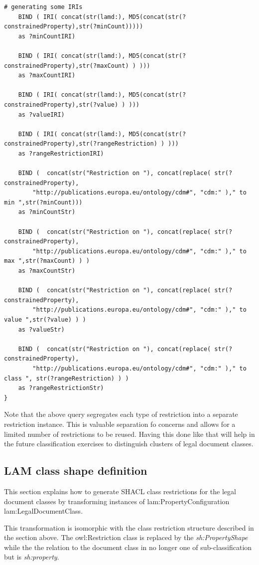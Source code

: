 \begin{lstlisting}[language=SPARQL, captionpos=b, caption={The transformation SPARQL query for LAM legal document class restrictions}, label=lst:sparql-class-restriction]
	# generating some IRIs
	BIND ( IRI( concat(str(lamd:), MD5(concat(str(?constrainedProperty),str(?minCount))))) 
	as ?minCountIRI)
	
	BIND ( IRI( concat(str(lamd:), MD5(concat(str(?constrainedProperty),str(?maxCount) ) ))) 
	as ?maxCountIRI)
	
	BIND ( IRI( concat(str(lamd:), MD5(concat(str(?constrainedProperty),str(?value) ) ))) 
	as ?valueIRI)
	
	BIND ( IRI( concat(str(lamd:), MD5(concat(str(?constrainedProperty),str(?rangeRestriction) ) ))) 
	as ?rangeRestrictionIRI)	
	
	BIND (  concat(str("Restriction on "), concat(replace( str(?constrainedProperty), 
		"http://publications.europa.eu/ontology/cdm#", "cdm:" )," to min ",str(?minCount))) 
	as ?minCountStr)
	
	BIND (  concat(str("Restriction on "), concat(replace( str(?constrainedProperty), 
		"http://publications.europa.eu/ontology/cdm#", "cdm:" )," to max ",str(?maxCount) ) ) 
	as ?maxCountStr)
	
	BIND (  concat(str("Restriction on "), concat(replace( str(?constrainedProperty), 
		"http://publications.europa.eu/ontology/cdm#", "cdm:" )," to value ",str(?value) ) ) 
	as ?valueStr)
	
	BIND (  concat(str("Restriction on "), concat(replace( str(?constrainedProperty), 
		"http://publications.europa.eu/ontology/cdm#", "cdm:" )," to class ", str(?rangeRestriction) ) ) 
	as ?rangeRestrictionStr)
}
	\end{lstlisting}
	
	Note that the above query segregates each type of restriction into a separate restriction instance. This is valuable separation fo concerns and allows for a limited number of restrictions to be reused. Having this done like that will help in the future classification exercises to distinguish clusters of legal document classes. 
	
\subsection{LAM class shape definition}
	
	This section explains how to generate SHACL class restrictions for the legal document classes by transforming instances of  lam:PropertyConfiguration lam:LegalDocumentClass. 
	
	This transformation is isomorphic with the class restriction structure described in the section above. The owl:Restriction class is replaced by the \textit{sh:PropertyShape} while the the relation to the document class in no longer one of sub-classification but is \textit{sh:property}.
	
